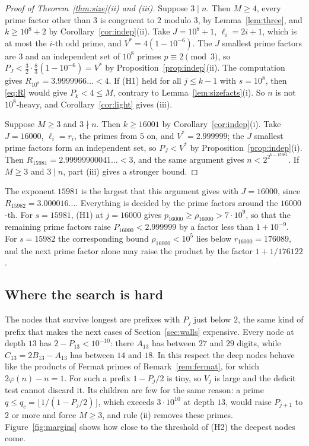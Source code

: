 \documentclass[11pt,reqno]{amsart}
\numberwithin{equation}{section}
\theoremstyle{plain}
\theoremstyle{definition}
\theoremstyle{remark}
\begin{document}
\begin{proof}[Proof of Theorem~\textup{\ref{thm:size}(ii)} and
\textup{(iii)}]
Suppose $3\mid n$. Then $M\ge4$, every prime factor other than $3$ is
congruent to $2$ modulo $3$, by Lemma~\ref{lem:three}, and
$k\ge10^8+2$ by Corollary~\ref{cor:indep}(ii). Take $J=10^8+1$,
$\ell_i=2i+1$, which is at most the $i$-th odd prime, and
$V^*=4(1-10^{-6})$. The $J$ smallest prime factors are $3$ and an
independent set of $10^8$ primes $p\equiv2\pmod3$, so
$P_J<\frac32\cdot\frac83(1-10^{-6})=V^*$ by
Proposition~\ref{prop:indep}(ii). The computation gives
$R_{10^8}=3.9999966\ldots<4$. If (H1) held for all $j\le k-1$ with
$s=10^8$, then \eqref{eq:R} would give $P_k<4\le M$, contrary to
Lemma~\ref{lem:sizefacts}(i). So $n$ is not $10^8$-heavy, and
Corollary~\ref{cor:light} gives (iii).

Suppose $M\ge3$ and $3\nmid n$. Then $k\ge16001$ by
Corollary~\ref{cor:indep}(i). Take $J=16000$, $\ell_i=r_i$, the primes
from $5$ on, and $V^*=2.999999$; the $J$ smallest prime factors form an
independent set, so $P_J<V^*$ by Proposition~\ref{prop:indep}(i).
Then $R_{15981}=2.99999900041\ldots<3$, and the same argument gives
$n<2^{2^{k-15981}}$. If $M\ge3$ and $3\mid n$, part (iii) gives a
stronger bound.
\end{proof}

The exponent $15981$ is the largest that this argument gives with
$J=16000$, since $R_{15982}=3.000016\ldots$. Everything is decided by
the prime factors around the $16000$-th. For $s=15981$, (H1) at
$j=16000$ gives $p_{16000}\ge\rho_{16000}>7\cdot10^9$, so that the
remaining prime factors raise $P_{16000}<2.999999$ by a factor less
than $1+10^{-9}$. For $s=15982$ the corresponding bound
$\rho_{16000}<10^5$ lies below $r_{16000}=176089$, and the next prime
factor alone may raise the product by the factor $1+1/176122$.

\subsection{Where the search is hard}\label{sec:hard}
The nodes that survive longest are prefixes with $P_j$ just below $2$,
the same kind of prefix that makes the next cases of
Section~\ref{sec:walls} expensive. Every node at depth $13$ has
$2-P_{13}<10^{-10}$: there $A_{13}$ has between $27$ and $29$ digits,
while $C_{13}=2B_{13}-A_{13}$ has between $14$ and $18$. In this
respect the deep nodes behave like the products of Fermat primes of
Remark~\ref{rem:fermat}, for which $2\varphi(n)-n=1$. For such a
prefix $1-P_j/2$ is tiny, so $V_j$ is large and the deficit test
cannot discard it. Its children are few for the same reason: a prime
$q\le q_c=\lfloor1/(1-P_j/2)\rfloor$, which exceeds $3\cdot10^{10}$ at
depth $13$, would raise $P_{j+1}$ to $2$ or more and force $M\ge3$, and
rule (ii) removes these primes. Figure~\ref{fig:margins} shows how
close to the threshold of (H2) the deepest nodes come.
\end{document}
